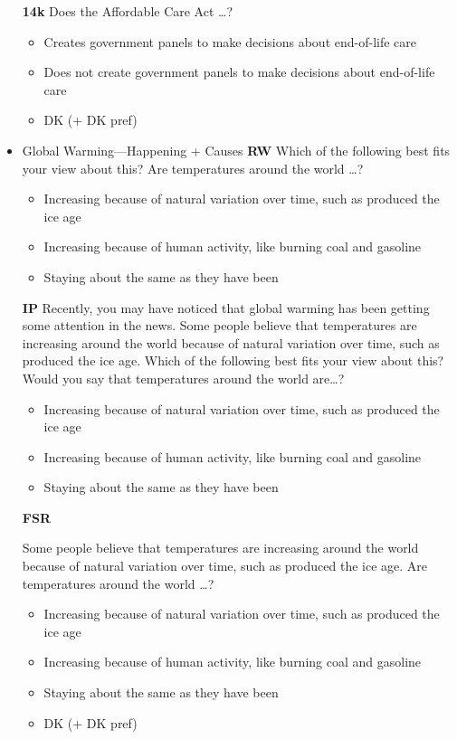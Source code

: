 \begin{itemize}
	\textbf{14k}\newline
	Does the Affordable Care Act \ldots?
	\begin{itemize}
		\item Creates government panels to make decisions about end-of-life care
		\item Does not create government panels to make decisions about end-of-life care
		\item DK (+ DK pref)
	\end{itemize}
	
	\item Global Warming—Happening + Causes\newline
	\textbf{RW}\newline
	Which of the following best fits your view about this? Are temperatures around the
	world \ldots?
	\begin{itemize}
		\item Increasing because of natural variation over time, such as produced the ice age
		\item Increasing because of human activity, like burning coal and gasoline
		\item Staying about the same as they have been
	\end{itemize}
	
	\textbf{IP}\newline
	Recently, you may have noticed that global warming has been getting some attention
	in the news. Some people believe that temperatures are increasing around the world
	because of natural variation over time, such as produced the ice age. Which of the
	following best fits your view about this? Would you say that temperatures around the
	world are\ldots?
	\begin{itemize}
		\item Increasing because of natural variation over time, such as produced the ice age
		\item Increasing because of human activity, like burning coal and gasoline
		\item Staying about the same as they have been
	\end{itemize}
	
	\textbf{FSR}\newline
	
	Some people believe that temperatures are increasing around the world because of
	natural variation over time, such as produced the ice age. Are temperatures around
	the world \ldots?
	\begin{itemize}
		\item Increasing because of natural variation over time, such as produced the ice age
		\item Increasing because of human activity, like burning coal and gasoline
		\item Staying about the same as they have been
		\item DK (+ DK pref)
	\end{itemize}
	

\end{itemize}
